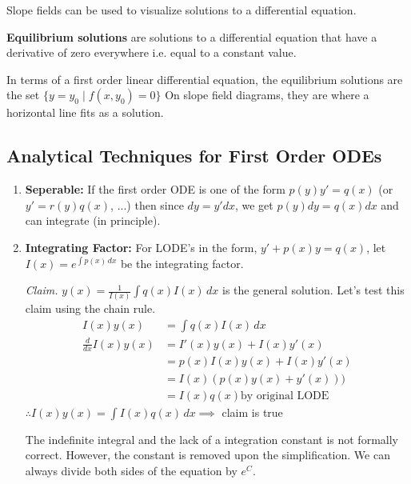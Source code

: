 \documentclass[../main.tex]{subfiles}
\begin{document}
\begin{note}
    Slope fields can be used to visualize solutions to a differential equation.
\end{note}

\begin{definition}
    \textbf{Equilibrium solutions} are solutions to a differential equation that have a derivative of zero everywhere i.e. equal to a constant value.
\end{definition}

In terms of a first order linear differential equation, the equilibrium solutions are the set \( \{ y = y_0 \mid f(x,y_0)=0 \} \)
On slope field diagrams, they are where a horizontal line fits as a solution.


\subsection{Analytical Techniques for First Order ODEs}

\begin{enumerate}[mode=unboxed]
    \item \textbf{Seperable:} If the first order ODE is one of the form \( p(y)y'=q(x) \) (or \( y'=r(y)q(x) \), ...)
        then since \( dy=y'dx \), we get \( p(y)dy=q(x)dx \) and can integrate (in principle).
    \item \textbf{Integrating Factor:} For LODE's in the form, \( y'+p(x)y=q(x) \), let \( I(x)= e^{\int p(x) \,dx} \) be the integrating factor.

        \textit{Claim.} \( y(x)= \frac{1}{I(x)}\int q(x) I(x) \,dx \) is the general solution.
        Let's test this claim using the chain rule.
        \begin{align*}
            I(x)y(x)&=\int q(x) I(x) \,dx \\
            \frac{d}{dx}I(x)y(x)&=I'(x)y(x)+I(x)y'(x) \\
            &= p(x)I(x)y(x)+I(x)y'(x) \\
            &= I(x)(p(x)y(x)+y'(x))) \\
            &= I(x)q(x) \text{by original LODE}
        \end{align*}
        \( \therefore I(x)y(x)=\int I(x)q(x) \,dx \implies\) claim is true 

        \begin{note}
            The indefinite integral and the lack of a integration constant is not formally correct.
            However, the constant is removed upon the simplification.
            We can always divide both sides of the equation by \( e^{C} \).
        \end{note}
\end{enumerate}
\end{document}
